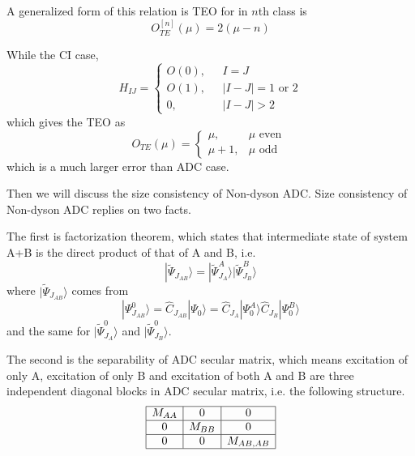 A generalized form of this relation is TEO for in $n$th class is
\begin{equation} \label{generalTEO}
	O_{T E}^{[n]}(\mu)=2(\mu-n)
\end{equation}

While the CI case, 
\begin{equation}
H_{IJ}=\left\{ 
\begin{array}{ll}
	O(0), & \text{ } I=J
	\\
	O(1), & \text{ } |I-J|=1 \text{ or } 2
	\\
	0,    & \text{ } |I-J|>2
\end{array}
\right.
\end{equation}
which gives the TEO as
\begin{equation}
	O_{T E}(\mu)=\left\{\begin{array}{ll}{\mu,} & {\mu \text { even }} \\ {\mu+1,} & {\mu \text { odd }}\end{array}\right.
\end{equation}
which is a much larger error than ADC case.

Then we will discuss the size consistency of Non-dyson ADC.
Size consistency of Non-dyson ADC replies on two facts.

The first is factorization theorem, which states that intermediate state of system A+B is the direct product of that of A and B, i.e.
\begin{equation}
	| \tilde{\Psi}_{J_{A B}} \rangle=| \tilde{\Psi}_{J_{A}}^{A} \rangle | \tilde{\Psi}_{J_{B}}^{B} \rangle
\end{equation}
where $| \tilde{\Psi}_{J_{A B}} \rangle$ comes from
\begin{equation}
	| \Psi_{J_{A B}}^{0} \rangle=\hat{C}_{J_{A B}} | \Psi_{0} \rangle=\hat{C}_{J_{A}} | \Psi_{0}^{A} \rangle \hat{C}_{J_{B}} | \Psi_{0}^{B} \rangle
\end{equation}
and the same for $| \tilde{\Psi}_{J_{A}}^{0} \rangle$ and $| \tilde{\Psi}_{J_{B}}^{0} \rangle$.

The second is the separability of ADC secular matrix, which means excitation of only A, excitation of only B and excitation of both A and B are three independent diagonal blocks in ADC secular matrix, i.e. the following structure.
\begin{equation}
	\begin{array}{|c|c|c|}
		\hline
		M_{AA} & 0 & 0
		\\
		\hline
		0 & M_{BB} & 0
		\\
		\hline
		0 & 0 & M_{AB,AB}
		\\
		\hline
	\end{array}
\end{equation}

